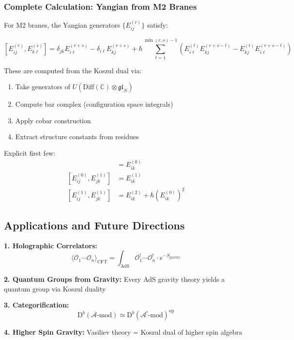 \subsubsection{Complete Calculation: Yangian from M2 Branes}

\begin{calculation}
For M2 branes, the Yangian generators $\{E_{ij}^{(r)}\}$ satisfy:

$$[E_{ij}^{(r)}, E_{k\ell}^{(s)}] = \delta_{jk}E_{i\ell}^{(r+s)} - \delta_{i\ell}E_{kj}^{(r+s)} + \hbar \sum_{t=1}^{\min(r,s)-1} \left(E_{i\ell}^{(t)}E_{kj}^{(r+s-t)} - E_{kj}^{(t)}E_{i\ell}^{(r+s-t)}\right)$$

These are computed from the Koszul dual via:
\begin{enumerate}
\item Take generators of $U(\text{Diff}(\mathbb{C}) \otimes \mathfrak{gl}_N)$
\item Compute bar complex (configuration space integrals)
\item Apply cobar construction
\item Extract structure constants from residues
\end{enumerate}

Explicit first few:
\begin{align}
[E_{ij}^{(0)}, E_{jk}^{(0)}] &= E_{ik}^{(0)} \\
[E_{ij}^{(0)}, E_{jk}^{(1)}] &= E_{ik}^{(1)} \\
[E_{ij}^{(1)}, E_{jk}^{(1)}] &= E_{ik}^{(2)} + \hbar(E_{ik}^{(0)})^2
\end{align}
\end{calculation}

\subsection{Applications and Future Directions}

\begin{applications}
\textbf{1. Holographic Correlators:}
$$\langle \mathcal{O}_1 \cdots \mathcal{O}_n \rangle_{\text{CFT}} = \int_{\text{AdS}} \mathcal{O}_1^! \cdots \mathcal{O}_n^! \cdot e^{-S_{\text{gravity}}}$$

\textbf{2. Quantum Groups from Gravity:}
Every AdS gravity theory yields a quantum group via Koszul duality

\textbf{3. Categorification:}
$$\text{D}^b(\mathcal{A}\text{-mod}) \simeq \text{D}^b(\mathcal{A}^!\text{-mod})^{\text{op}}$$

\textbf{4. Higher Spin Gravity:}
Vasiliev theory = Koszul dual of higher spin algebra
\end{applications}
